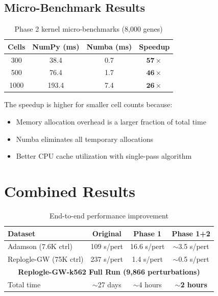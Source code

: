 \documentclass{article}
\begin{document}
\subsection{Micro-Benchmark Results}

\begin{table}[h]
\centering
\caption{Phase 2 kernel micro-benchmarks (8,000 genes)}
\label{tab:phase2}
\begin{tabular}{cccc}
\toprule
\textbf{Cells} & \textbf{NumPy (ms)} & \textbf{Numba (ms)} & \textbf{Speedup} \\
\midrule
300 & 38.4 & 0.7 & $\mathbf{57\times}$ \\
500 & 76.4 & 1.7 & $\mathbf{46\times}$ \\
1000 & 193.4 & 7.4 & $\mathbf{26\times}$ \\
\bottomrule
\end{tabular}
\end{table}

The speedup is higher for smaller cell counts because:
\begin{itemize}
    \item Memory allocation overhead is a larger fraction of total time
    \item Numba eliminates all temporary allocations
    \item Better CPU cache utilization with single-pass algorithm
\end{itemize}

\section{Combined Results}

\begin{table}[h]
\centering
\caption{End-to-end performance improvement}
\label{tab:combined}
\begin{tabular}{lccc}
\toprule
\textbf{Dataset} & \textbf{Original} & \textbf{Phase 1} & \textbf{Phase 1+2} \\
\midrule
Adamson (7.6K ctrl) & 109 s/pert & 16.6 s/pert & $\sim$3.5 s/pert \\
Replogle-GW (75K ctrl) & 237 s/pert & 1.4 s/pert & $\sim$0.5 s/pert \\
\midrule
\multicolumn{4}{c}{\textbf{Replogle-GW-k562 Full Run (9,866 perturbations)}} \\
\midrule
Total time & $\sim$27 days & $\sim$4 hours & $\sim$\textbf{2 hours} \\
\bottomrule
\end{tabular}
\end{table}
\end{document}

